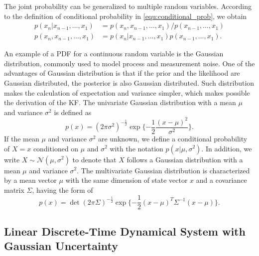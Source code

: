 The joint probability can be generalized to multiple random variables. 
According to the definition of conditional probability in \cref{equ:conditional_prob}, we obtain
\begin{subequations} \label{equ:joint_prob_multiple_random_variables}
	\begin{align}
		p(x_n|x_{n-1},\ldots,x_1) &= p(x_n,x_{n-1},\ldots,x_1)/p(x_{n-1},\ldots,x_1)\\
		p(x_n,x_{n-1},\ldots,x_1)&=	p(x_n|x_{n-1},\ldots,x_1)p(x_{n-1},\ldots,x_1).\label{equ:joint_prob_expand_rule}
	\end{align}
\end{subequations}

An example of a PDF for a continuous random variable is the Gaussian distribution, commonly used to model process and measurement noise.
One of the advantages of Gaussian distribution is that if the prior and the likelihood are Gaussian distributed, the posterior is also Gaussian distributed. Such distribution makes the calculation of expectation and variance simpler, which makes possible the derivation of the KF.
The univariate Gaussian distribution with a mean $\mu$ and variance $\sigma^2$ is defined as
\begin{equation}\label{equ:gaussian}
	p(x)=(2\pi \sigma^2 )^{-\frac{1}{2}}
	\exp\{-\frac{1}{2} \frac{(x-\mu)^2}{\sigma^2}\}.
\end{equation}
If the mean $\mu$ and variance $\sigma^2$ are unknown, we define a conditional probability of $X=x$ conditioned on $\mu$ and $\sigma^2$ with the notation $p(x|\mu,\sigma^2)$.
In addition, we write
$X \sim \mathcal{N}(\mu,\sigma^2)$
to denote that $X$ follows a Gaussian distribution with a mean $\mu$ and variance $\sigma^2$.
The multivariate Gaussian distribution is characterized by a mean vector $\mu$ with the same dimension of state vector $x$ and a covariance matrix $\Sigma$, having the form of  
\begin{equation} \label{equ:multivariate_gaussian}
	p(x)=\det (2\pi \Sigma)^{-\frac{1}{2}}
	\exp\{-\frac{1}{2}(x-\mu)^T\Sigma^{-1}(x-\mu)\}.
\end{equation}
 


\subsection{Linear Discrete-Time Dynamical System with Gaussian Uncertainty} \label{sec:linear_system}

